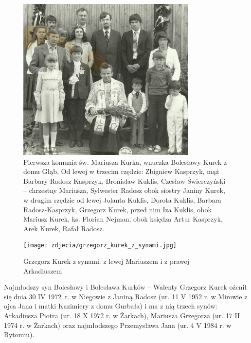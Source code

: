 \begin{figure}[!h]
\begin{center}
\includegraphics[width=0.8\textwidth]{zdjecia/pierwsza_komunia_mariusza_kurka.jpg}
\caption[Pierwsza komunia św. Mariusza Kurka]{Pierwsza komunia św. Mariusza Kurka, wnuczka Bolesławy Kurek z domu Głąb. Od lewej w trzecim rzędzie: Zbigniew Kasprzyk, mąż Barbary Radosz Kasprzyk, Bronisław Kuklis, Czesław Świerczyński -- chrzestny Mariusza, Sylwester Radosz obok siostry Janiny Kurek, w drugim rzędzie od lewej Jolanta Kuklis, Dorota Kuklis, Barbara Radosz-Kasprzyk, Grzegorz Kurek, przed nim Iza Kuklis, obok Mariusz Kurek, ks. Florian Nejman, obok księdza Artur Kasprzyk, Arek Kurek, Rafał Radosz.}
\label{rys:pierwsza_komunia_mariusza_kurka}
\end{center}
\end{figure}

\begin{figure}[!h]
\begin{center}
\texttt{[image: zdjecia/grzegorz\_kurek\_z\_synami.jpg]}
\caption[Grzegorz Kurek z synami]{Grzegorz Kurek z synami: z lewej Mariuszem i z prawej Arkadiuszem}
\label{rys:grzegorz_kurek_z_synami}
\end{center}
\end{figure}

Najmłodszy syn Bolesławy i Bolesława Kurków -- Walenty Grzegorz Kurek ożenił się dnia 30 IV 1972~r. w Niegowie z Janiną Radosz (ur. 11 V 1952 r. w Mirowie z ojca Jana i matki Kazimiery z domu Gurbała) i ma z nią trzech synów: Arkadiusza Piotra (ur. 18 X 1972 r. w Żarkach), Mariusza Grzegorza (ur. 17 II 1974 r. w Żarkach) oraz najmłodszego Przemysława Jana (ur. 4 V 1984 r. w Bytomiu).


